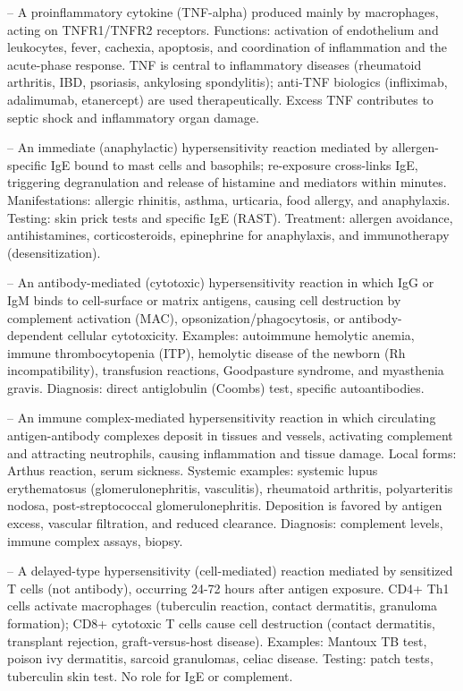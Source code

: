 -- A proinflammatory cytokine (TNF-alpha) produced mainly by macrophages, acting on TNFR1/TNFR2 receptors. Functions: activation of endothelium and leukocytes, fever, cachexia, apoptosis, and coordination of inflammation and the acute-phase response. TNF is central to inflammatory diseases (rheumatoid arthritis, IBD, psoriasis, ankylosing spondylitis); anti-TNF biologics (infliximab, adalimumab, etanercept) are used therapeutically. Excess TNF contributes to septic shock and inflammatory organ damage.

-- An immediate (anaphylactic) hypersensitivity reaction mediated by allergen-specific IgE bound to mast cells and basophils; re-exposure cross-links IgE, triggering degranulation and release of histamine and mediators within minutes. Manifestations: allergic rhinitis, asthma, urticaria, food allergy, and anaphylaxis. Testing: skin prick tests and specific IgE (RAST). Treatment: allergen avoidance, antihistamines, corticosteroids, epinephrine for anaphylaxis, and immunotherapy (desensitization).

-- An antibody-mediated (cytotoxic) hypersensitivity reaction in which IgG or IgM binds to cell-surface or matrix antigens, causing cell destruction by complement activation (MAC), opsonization/phagocytosis, or antibody-dependent cellular cytotoxicity. Examples: autoimmune hemolytic anemia, immune thrombocytopenia (ITP), hemolytic disease of the newborn (Rh incompatibility), transfusion reactions, Goodpasture syndrome, and myasthenia gravis. Diagnosis: direct antiglobulin (Coombs) test, specific autoantibodies.

-- An immune complex-mediated hypersensitivity reaction in which circulating antigen-antibody complexes deposit in tissues and vessels, activating complement and attracting neutrophils, causing inflammation and tissue damage. Local forms: Arthus reaction, serum sickness. Systemic examples: systemic lupus erythematosus (glomerulonephritis, vasculitis), rheumatoid arthritis, polyarteritis nodosa, post-streptococcal glomerulonephritis. Deposition is favored by antigen excess, vascular filtration, and reduced clearance. Diagnosis: complement levels, immune complex assays, biopsy.

-- A delayed-type hypersensitivity (cell-mediated) reaction mediated by sensitized T cells (not antibody), occurring 24-72 hours after antigen exposure. CD4+ Th1 cells activate macrophages (tuberculin reaction, contact dermatitis, granuloma formation); CD8+ cytotoxic T cells cause cell destruction (contact dermatitis, transplant rejection, graft-versus-host disease). Examples: Mantoux TB test, poison ivy dermatitis, sarcoid granulomas, celiac disease. Testing: patch tests, tuberculin skin test. No role for IgE or complement.

